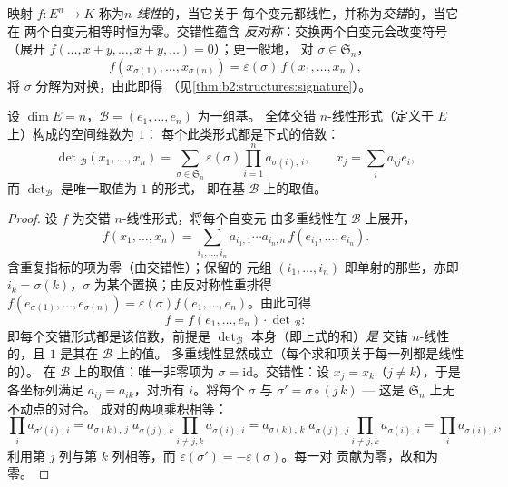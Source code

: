 \begin{definition}\label{def:b2:linalg:alternating}
映射 $f \colon E^n \to K$ 称为\emph{$n$-线性}的，当它关于
每个变元都线性，并称为\emph{交错}的，当它在
两个自变元相等时恒为零。交错性蕴含
\emph{反对称}：交换两个自变元会改变符号
（展开 $f(\dots, x + y, \dots, x + y, \dots) = 0$）；更一般地，
对 $\sigma \in \mathfrak{S}_n$，
\[
f(x_{\sigma(1)}, \dots, x_{\sigma(n)}) =
\varepsilon(\sigma)\, f(x_1, \dots, x_n),
\]
将 $\sigma$ 分解为对换，由此即得
（见\cref{thm:b2:structures:signature}）。
\end{definition}

\begin{theorem}[行列式基本定理]\label{thm:b2:linalg:detspace}
设 $\dim E = n$，$\mathcal{B} = (e_1, \dots, e_n)$ 为一组基。
全体交错 $n$-线性形式（定义于 $E$ 上）构成的空间维数为 $1$：
每个此类形式都是下式的倍数：
\[
\det{}_{\mathcal{B}}(x_1, \dots, x_n)
= \sum_{\sigma \in \mathfrak{S}_n} \varepsilon(\sigma)
\prod_{i=1}^{n} a_{\sigma(i),\,i},
\qquad
x_j = \sum_{i} a_{ij} e_i ,
\]
而 $\det_{\mathcal{B}}$ 是唯一取值为 $1$ 的形式，
即在基 $\mathcal{B}$ 上的取值。
\end{theorem}

\begin{proof}
设 $f$ 为交错 $n$-线性形式，将每个自变元
由多重线性在 $\mathcal{B}$ 上展开，
\[
f(x_1, \dots, x_n)
= \sum_{i_1, \dots, i_n} a_{i_1,1}\cdots a_{i_n,n}\,
f(e_{i_1}, \dots, e_{i_n}).
\]
含重复指标的项为零（由交错性）；保留的
元组 $(i_1, \dots, i_n)$ 即单射的那些，亦即 $i_k =
\sigma(k)$，$\sigma$ 为某个置换；由反对称性重排得
$f(e_{\sigma(1)}, \dots, e_{\sigma(n)}) = \varepsilon(\sigma)
f(e_1, \dots, e_n)$。由此可得
\[
f = f(e_1, \dots, e_n) \cdot \det{}_{\mathcal{B}} :
\]
即每个交错形式都是该倍数，前提是
$\det_{\mathcal{B}}$ 本身（即上式的和）\emph{是}
交错 $n$-线性的，且 $1$ 是其在 $\mathcal B$ 上的值。
多重线性显然成立（每个求和项关于每一列都是线性的）。
在 $\mathcal B$ 上的取值：唯一非零项为 $\sigma =
\mathrm{id}$。交错性：设 $x_j = x_k$（$j \neq k$），于是
各坐标列满足 $a_{i j} = a_{i k}$，对所有
$i$。将每个 $\sigma$ 与 $\sigma' = \sigma\circ(j\,k)$ ---
这是 $\mathfrak{S}_n$ 上无不动点的对合。
成对的两项乘积相等：
\[
\prod_i a_{\sigma'(i),\,i}
= a_{\sigma(k),\,j}\; a_{\sigma(j),\,k}
\prod_{i \neq j,k} a_{\sigma(i),\,i}
= a_{\sigma(k),\,k}\; a_{\sigma(j),\,j}
\prod_{i \neq j,k} a_{\sigma(i),\,i}
= \prod_i a_{\sigma(i),\,i},
\]
利用第 $j$ 列与第 $k$ 列相等，而
$\varepsilon(\sigma') = -\varepsilon(\sigma)$。每一对
贡献为零，故和为零。
\end{proof}

